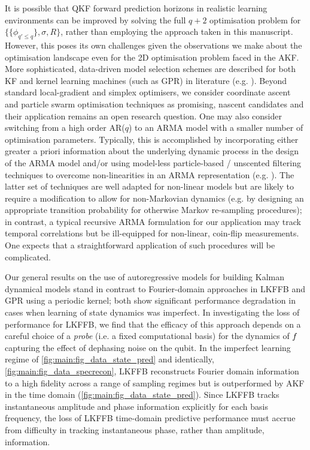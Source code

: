 It is possible that QKF forward prediction horizons in realistic learning environments can be improved by solving the full $q+2$ optimisation problem for $\{\{ \phi_{q' \leq q}\}, \sigma, R\}$, rather than employing the approach taken in this manuscript. However, this poses its own challenges given the observations we make about the optimisation landscape even for the 2D optimisation problem faced in the AKF.  More sophisticated, data-driven model selection schemes are described for both KF and kernel learning machines (such as GPR) in literature (e.g. \cite{arlot2009data, vu2015understanding}). Beyond standard local-gradient and simplex optimisers, we consider coordinate ascent \cite{abbeel2005} and particle swarm optimisation techniques \cite{robertson2017particle} as promising, nascent candidates and their application remains an open research question. One may also consider switching from a high order AR($q$) to an ARMA model with a smaller number of optimisation parameters. Typically, this is accomplished by incorporating either greater a priori information about the underlying dynamic process in the design of the ARMA model and/or using model-less particle-based / unscented filtering techniques to overcome non-linearities in an ARMA representation (e.g. \cite{dong2009unscented}). The latter set of techniques are well adapted for non-linear models but are likely to require a modification to allow for non-Markovian dynamics (e.g. by designing an appropriate transition probability for otherwise Markov re-sampling procedures); in contrast, a typical recursive ARMA formulation for our application may track temporal correlations but be ill-equipped for non-linear, coin-flip measurements. One expects that a straightforward application of such procedures will be complicated.

Our general results on the use of autoregressive models for building Kalman dynamical models stand in contrast to Fourier-domain approaches in LKFFB and GPR using a periodic kernel;  both show significant performance degradation in cases when learning of state dynamics was imperfect.  In investigating the loss of performance for LKFFB, we find that the efficacy of this approach depends on a careful choice of a \textit{probe} (i.e. a fixed computational basis) for the dynamics of $f$ capturing the effect of dephasing noise on the qubit.  In the imperfect learning regime of \cref{fig:main:fig_data_state_pred} and identically, \cref{fig:main:fig_data_specrecon}, LKFFB reconstructs Fourier domain information to a high fidelity across a range of sampling regimes but is outperformed by AKF in the time domain (\cref{fig:main:fig_data_state_pred}). Since LKFFB tracks instantaneous amplitude and phase information explicitly for each basis frequency, the loss of LKFFB time-domain predictive performance must accrue from difficulty in tracking instantaneous phase, rather than amplitude, information. 

